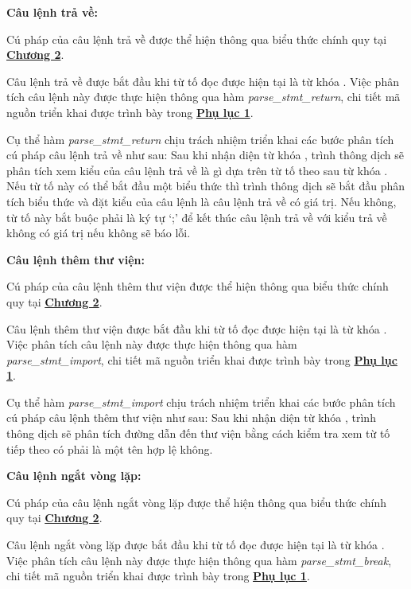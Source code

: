 \textbf{Câu lệnh trả về:}

Cú pháp của câu lệnh trả về được thể hiện thông qua biểu thức chính quy tại \hyperref[ch2:block_stmt]{\bf Chương 2}.

Câu lệnh trả về được bắt đầu khi từ tố đọc được hiện tại là từ khóa . Việc phân tích câu lệnh này được thực hiện thông qua hàm \textit{parse\_stmt\_return}, chi tiết mã nguồn triển khai được trình bày trong \hyperref[ap1:stmt_yeet]{\bf Phụ lục 1}. %

Cụ thể hàm \textit{parse\_stmt\_return} chịu trách nhiệm triển khai các bước phân tích cú pháp câu lệnh trả về như sau: 
Sau khi nhận diện từ khóa , trình thông dịch sẽ phân tích xem kiểu của câu lệnh trả về là gì dựa trên từ tố theo sau từ khóa . Nếu từ tố này có thể bắt đầu một biểu thức thì trình thông dịch sẽ bắt đầu phân tích biểu thức và đặt kiểu của câu lệnh là câu lệnh trả về có giá trị. Nếu không, từ tố này bắt buộc phải là ký tự `;' để kết thúc câu lệnh trả về với kiểu trả về không có giá trị nếu không sẽ báo lỗi.

\textbf{Câu lệnh thêm thư viện:}

Cú pháp của câu lệnh thêm thư viện được thể hiện thông qua biểu thức chính quy tại \hyperref[ch2:block_stmt]{\bf Chương 2}.

Câu lệnh thêm thư viện được bắt đầu khi từ tố đọc được hiện tại là từ khóa . Việc phân tích câu lệnh này được thực hiện thông qua hàm \\\textit{parse\_stmt\_import}, chi tiết mã nguồn triển khai được trình bày trong \hyperref[ap1:stmt_add]{\bf Phụ lục 1}. %

Cụ thể hàm \textit{parse\_stmt\_import} chịu trách nhiệm triển khai các bước phân tích cú pháp câu lệnh thêm thư viện như sau: 
Sau khi nhận diện từ khóa , trình thông dịch sẽ phân tích đường dẫn đến thư viện bằng cách kiểm tra xem từ tố tiếp theo có phải là một tên hợp lệ không.

\textbf{Câu lệnh ngắt vòng lặp:}

Cú pháp của câu lệnh ngắt vòng lặp được thể hiện thông qua biểu thức chính quy tại \hyperref[ch2:block_stmt]{\bf Chương 2}.

Câu lệnh ngắt vòng lặp được bắt đầu khi từ tố đọc được hiện tại là từ khóa . Việc phân tích câu lệnh này được thực hiện thông qua hàm \textit{parse\_stmt\_break}, chi tiết mã nguồn triển khai được trình bày trong \hyperref[ap1:stmt_br]{\bf Phụ lục 1}. %

